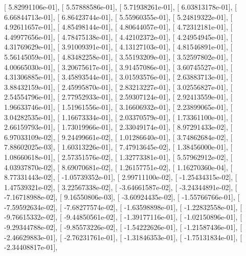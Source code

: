 \documentclass{article}
\begin{document}
       [  5.82991106e-01],
       [  5.57888586e-01],
       [  5.71938261e-01],
       [  6.03813178e-01],
       [  6.66844713e-01],
       [  6.86423744e-01],
       [  5.55960355e-01],
       [  5.24819322e-01],
       [  4.92611657e-01],
       [  4.85498144e-01],
       [  4.80644057e-01],
       [  4.72312181e-01],
       [  4.49977656e-01],
       [  4.78475138e-01],
       [  4.42102372e-01],
       [  4.24954945e-01],
       [  4.31769629e-01],
       [  3.91009391e-01],
       [  4.13127103e-01],
       [  4.81546891e-01],
       [  5.56145059e-01],
       [  4.83482258e-01],
       [  3.55193209e-01],
       [  3.52597802e-01],
       [  4.00665030e-01],
       [  3.20675617e-01],
       [  3.91457086e-01],
       [  3.60745527e-01],
       [  4.31306885e-01],
       [  3.45893544e-01],
       [  3.01593576e-01],
       [  2.63883713e-01],
       [  3.88432159e-01],
       [  2.45995870e-01],
       [  2.83213227e-01],
       [  3.02556827e-01],
       [  2.54554796e-01],
       [  2.77952933e-01],
       [  2.59307124e-01],
       [  2.92413559e-01],
       [  1.96633746e-01],
       [  1.51961556e-01],
       [  3.16606932e-01],
       [  2.23899065e-01],
       [  3.04282535e-01],
       [  1.16673334e-01],
       [  2.03370579e-01],
       [  1.73361100e-01],
       [  2.66159793e-01],
       [  1.73019966e-01],
       [  2.33049174e-01],
       [  8.97291433e-02],
       [  6.97033109e-02],
       [  9.24499661e-02],
       [  1.01286640e-01],
       [  3.74862684e-02],
       [  7.88602025e-03],
       [  1.60313226e-01],
       [  7.47913645e-02],
       [  1.38456000e-01],
       [  1.08660618e-01],
       [  2.57351576e-02],
       [  1.32773381e-01],
       [  5.57962912e-02],
       [  4.03937870e-02],
       [  8.69070681e-02],
       [  1.26157751e-02],
       [  1.16270360e-04],
       [  8.77331443e-02],
       [ -1.05739352e-01],
       [  2.99711100e-02],
       [ -1.25434315e-02],
       [  1.47539321e-02],
       [  3.22567338e-02],
       [ -3.64661587e-02],
       [ -3.24344891e-02],
       [ -7.16718988e-02],
       [  9.16550806e-03],
       [ -3.60924435e-02],
       [ -1.55766766e-01],
       [ -7.59592634e-02],
       [ -7.68277574e-02],
       [ -1.63598898e-01],
       [ -1.22832558e-01],
       [ -9.76615332e-02],
       [ -9.44850561e-02],
       [ -1.39177116e-01],
       [ -1.02150896e-01],
       [ -9.29344788e-02],
       [ -9.85573226e-02],
       [ -1.54222626e-01],
       [ -1.21587436e-01],
       [ -2.46629883e-01],
       [ -2.76231761e-01],
       [ -1.31846353e-01],
       [ -1.75131834e-01],
       [ -2.34408817e-01],
\end{document}

